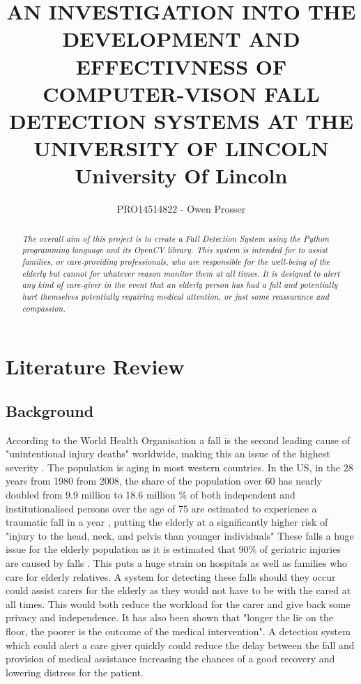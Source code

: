 \documentclass[11pt,a4paper]{report}
\title{
	{AN INVESTIGATION INTO THE DEVELOPMENT AND EFFECTIVNESS OF COMPUTER-VISON FALL DETECTION SYSTEMS AT THE UNIVERSITY OF LINCOLN}\\
	{\large University Of Lincoln}
}
\author{PRO14514822 - Owen Prosser}
\newcommand\blankpage{%
    \null
    \thispagestyle{empty}%
    \addtocounter{page}{-1}%
    \newpage}
\begin{document}
\maketitle

\begin{abstract}
\emph{The overall aim of this project is to create a Fall Detection System using the Python programming language and its OpenCV library. This system is intended for to assist families, or care-providing professionals, who are responsible for the well-being of the elderly but cannot for whatever reason monitor them at all times. It is designed to alert any kind of care-giver in the event that an elderly person has had a fall and potentially hurt themselves potentially requiring medical attention, or just some reassurance and compassion.}
\end{abstract}


\tableofcontents


\chapter{Literature Review}
\section{Background}
According to the World Health Organisation a fall is the second leading cause of "unintentional injury deaths" worldwide, making this an issue of the highest severity \citep{Cruz_Fall_detection_wearable_device}. The population is aging in most western countries. In the US, in the 28 years from 1980 from 2008, the share of the population over 60 has nearly doubled from 9.9 million to 18.6 million \citep{Siracuse_Health_care_and_socioeconomic}\% of both independent and institutionalised persons over the age of 75 are estimated to experience a traumatic fall in a year \citep{Sixsmith_A_smart_sensor_to_detect}, putting the elderly at a significantly higher risk of "injury to the head, neck, and pelvis than younger individuals"  These falls a huge issue for the elderly population as it is estimated that 90\% of geriatric injuries are caused by falls \citep{boltz_Injuries_and_outcomes}. This puts a huge strain on hospitals as well as families who care for elderly relatives. A system for detecting these falls should they occur could assist carers for the elderly as they would not have to be with the cared at all times. This would both reduce the workload for the carer and give back some privacy and independence. It has also been shown that "longer the lie on the floor, the poorer is the outcome of the medical intervention"\citep{Li_A_microphone_array}. A detection system which could alert a care giver quickly could reduce the delay between the fall and provision of medical assistance increasing the chances of a good recovery and lowering distress for the patient.
\end{document}
